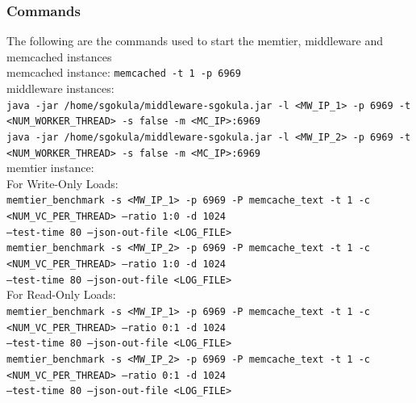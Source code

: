 \documentclass[11pt,a4paper]{article}
\begin{document}
\subsubsection{Commands}
The following are the commands used to start the memtier, middleware and memcached instances \\
{\scriptsize memcached instance: \texttt{memcached -t 1 -p 6969} \\
middleware instances: \\
	\texttt{java -jar /home/sgokula/middleware-sgokula.jar -l <MW\_IP\_1> -p 6969 -t <NUM\_WORKER\_THREAD> -s false -m <MC\_IP>:6969} \\
	\texttt{java -jar /home/sgokula/middleware-sgokula.jar -l <MW\_IP\_2> -p 6969 -t <NUM\_WORKER\_THREAD> -s false -m <MC\_IP>:6969} \\
memtier instance: \\
	For Write-Only Loads: \\
		\texttt{memtier\_benchmark -s <MW\_IP\_1> -p 6969 -P memcache\_text -t 1 -c <NUM\_VC\_PER\_THREAD> --ratio 1:0 -d 1024 \\ --test-time 80 --json-out-file <LOG\_FILE>} \\
		\texttt{memtier\_benchmark -s <MW\_IP\_2> -p 6969 -P memcache\_text -t 1 -c <NUM\_VC\_PER\_THREAD> --ratio 1:0 -d 1024 \\ --test-time 80 --json-out-file <LOG\_FILE>} \\
	For Read-Only Loads: \\
		\texttt{memtier\_benchmark -s <MW\_IP\_1> -p 6969 -P memcache\_text -t 1 -c <NUM\_VC\_PER\_THREAD> --ratio 0:1 -d 1024 \\ --test-time 80 --json-out-file <LOG\_FILE>} \\
		\texttt{memtier\_benchmark -s <MW\_IP\_2> -p 6969 -P memcache\_text -t 1 -c <NUM\_VC\_PER\_THREAD> --ratio 0:1 -d 1024 \\ --test-time 80 --json-out-file <LOG\_FILE>} \\
		} \\
\end{document}
